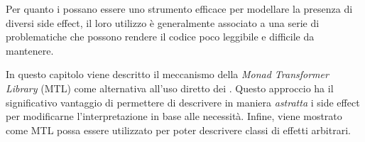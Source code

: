 Per quanto i  possano essere uno strumento efficace per modellare la presenza di diversi side effect, il loro utilizzo è generalmente associato a una serie di problematiche che possono rendere il codice poco leggibile e difficile da mantenere.

In questo capitolo viene descritto il meccanismo della \emph{Monad Transformer Library} (MTL) come alternativa all'uso diretto dei . Questo approccio ha il significativo vantaggio di permettere di descrivere in maniera \emph{astratta} i side effect per modificarne l'interpretazione in base alle necessità.
Infine, viene mostrato come MTL possa essere utilizzato per poter descrivere classi di effetti arbitrari.
